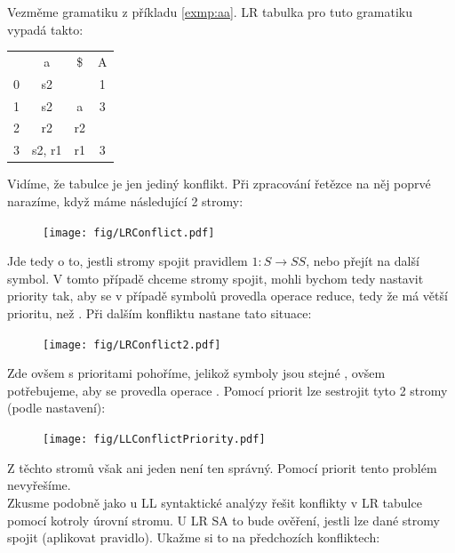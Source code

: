 \begin{exmp}
  Vezměme gramatiku z příkladu \ref{exmp:aa}. LR tabulka pro tuto gramatiku
  vypadá takto:
  \begin{table}[H]
    \centering
    \begin{tabular}{| c || c | c | c |}
      \hline
        &	a  &	\$ &	A \\
      \hhline{|=||=|=|=|}
      0 &	s2 &    & 1 \\
      \hline
      1	& s2 & a	& 3 \\
      \hline
      2	& r2 & r2 &   \\
      \hline
      3 & s2, r1& r1 & 3 \\
      \hline
    \end{tabular}
  \end{table}

  Vidíme, že tabulce je jen jediný konflikt. Při zpracování řetězce
   na něj poprvé narazíme, když máme následující 2 stromy:

  \begin{figure}[H]
    \centering
    \texttt{[image: fig/LRConflict.pdf]}
  \end{figure}

  Jde tedy o to, jestli stromy spojit pravidlem $1: S \rightarrow SS$, nebo přejít
  na další symbol. V tomto případě chceme stromy spojit, mohli bychom tedy
  nastavit priority tak, aby se v případě symbolů \symb{[S, a]} provedla operace
  reduce, tedy že  má větší prioritu, než . Při dalším konfliktu nastane
  tato situace:

  \begin{figure}[H]
    \centering
    \texttt{[image: fig/LRConflict2.pdf]}
  \end{figure}

  Zde ovšem s prioritami pohoříme, jelikož symboly jsou stejné \symb{[S, a]},
  ovšem potřebujeme, aby se provedla operace . Pomocí priorit lze
  sestrojit tyto 2 stromy (podle nastavení):

  \begin{figure}[H]
    \centering
    \texttt{[image: fig/LLConflictPriority.pdf]}
  \end{figure}

  Z těchto stromů však ani jeden není ten správný. Pomocí priorit tento problém
  nevyřešíme.\\

  Zkusme podobně jako u LL syntaktické analýzy řešit konflikty v LR tabulce
  pomocí kotroly úrovní stromu. U LR SA to bude ověření, jestli lze
  dané stromy spojit (aplikovat pravidlo). Ukažme si to na předchozích
  konfliktech:


\end{exmp}
